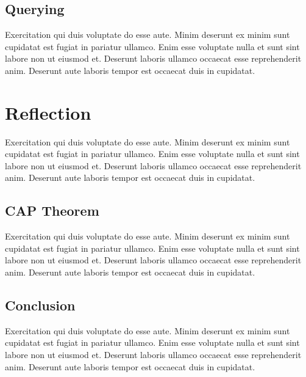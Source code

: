 \subsection{Querying} \label{subsec:queryingNeo4j}

Exercitation qui duis voluptate do esse aute. Minim deserunt ex minim sunt cupidatat est fugiat in pariatur ullamco. Enim esse voluptate nulla et sunt sint labore non ut eiusmod et. Deserunt laboris ullamco occaecat esse reprehenderit anim. Deserunt aute laboris tempor est occaecat duis in cupidatat.

\section{Reflection} \label{sec:reflectionNeo4j}

Exercitation qui duis voluptate do esse aute. Minim deserunt ex minim sunt cupidatat est fugiat in pariatur ullamco. Enim esse voluptate nulla et sunt sint labore non ut eiusmod et. Deserunt laboris ullamco occaecat esse reprehenderit anim. Deserunt aute laboris tempor est occaecat duis in cupidatat.

\subsection{CAP Theorem} \label{subsec:capTheoremNeo4j}

Exercitation qui duis voluptate do esse aute. Minim deserunt ex minim sunt cupidatat est fugiat in pariatur ullamco. Enim esse voluptate nulla et sunt sint labore non ut eiusmod et. Deserunt laboris ullamco occaecat esse reprehenderit anim. Deserunt aute laboris tempor est occaecat duis in cupidatat.

\subsection{Conclusion} \label{subsec:conclusionNeo4j}

Exercitation qui duis voluptate do esse aute. Minim deserunt ex minim sunt cupidatat est fugiat in pariatur ullamco. Enim esse voluptate nulla et sunt sint labore non ut eiusmod et. Deserunt laboris ullamco occaecat esse reprehenderit anim. Deserunt aute laboris tempor est occaecat duis in cupidatat.
